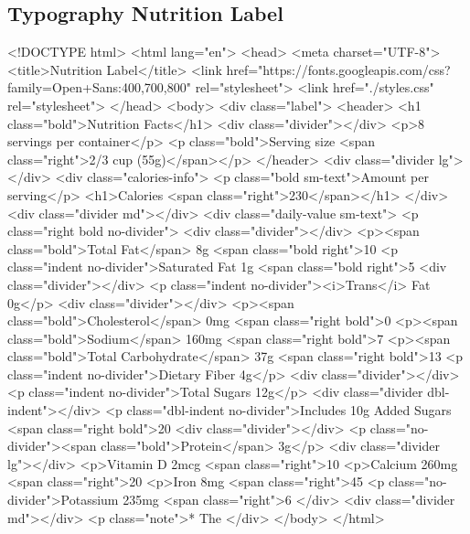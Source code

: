 \subsection{Typography Nutrition Label}
\begin{html}
<!DOCTYPE html>
<html lang="en">
  <head>
    <meta charset="UTF-8">
    <title>Nutrition Label</title>
    <link href="https://fonts.googleapis.com/css?family=Open+Sans:400,700,800" rel="stylesheet">
    <link href="./styles.css" rel="stylesheet">
  </head>
  <body>
    <div class="label">
      <header>
        <h1 class="bold">Nutrition Facts</h1>
        <div class="divider"></div>
        <p>8 servings per container</p>
        <p class="bold">Serving size <span class="right">2/3 cup (55g)</span></p>
      </header>
      <div class="divider lg"></div>
      <div class="calories-info">
        <p class="bold sm-text">Amount per serving</p>
        <h1>Calories <span class="right">230</span></h1>
      </div>
      <div class="divider md"></div>
      <div class="daily-value sm-text">
        <p class="right bold no-divider">%
        <div class="divider"></div>
        <p><span class="bold">Total Fat</span> 8g <span class="bold right">10%
        <p class="indent no-divider">Saturated Fat 1g <span class="bold right">5%
        <div class="divider"></div>
        <p class="indent no-divider"><i>Trans</i> Fat 0g</p>
        <div class="divider"></div>
        <p><span class="bold">Cholesterol</span> 0mg <span class="right bold">0%
        <p><span class="bold">Sodium</span> 160mg <span class="right bold">7%
        <p><span class="bold">Total Carbohydrate</span> 37g <span class="right bold">13%
        <p class="indent no-divider">Dietary Fiber 4g</p>
        <div class="divider"></div>
        <p class="indent no-divider">Total Sugars 12g</p>
        <div class="divider dbl-indent"></div>
        <p class="dbl-indent no-divider">Includes 10g Added Sugars <span class="right bold">20%
        <div class="divider"></div>
        <p class="no-divider"><span class="bold">Protein</span> 3g</p>
        <div class="divider lg"></div>
        <p>Vitamin D 2mcg <span class="right">10%
        <p>Calcium 260mg <span class="right">20%
        <p>Iron 8mg <span class="right">45%
        <p class="no-divider">Potassium 235mg <span class="right">6%
      </div>
      <div class="divider md"></div>
      <p class="note">* The %
    </div>
  </body>
</html>
\end{html}
